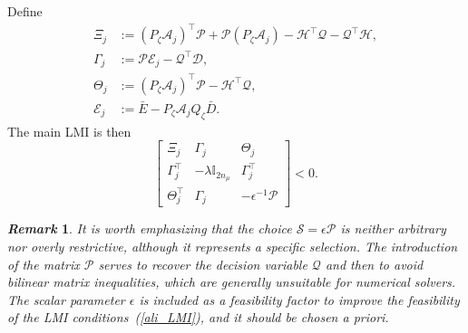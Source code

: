 \documentclass{ifacconf}
\def\eqref#1{(\ref{#1})}
\newtheorem{remark}{\it \textbf{Remark}}%
\begin{document}

Define
\begin{align*}
\Xi_j &:= \left(P_{\zeta}\mathcal{A}_{j}\right)^{\top}\mathcal{P}
      + \mathcal{P}\left(P_{\zeta}\mathcal{A}_{j}\right)
      - \mathcal{H}^{\top}\mathcal{Q} - \mathcal{Q}^{\top}\mathcal{H},\\
\Gamma_j &:= \mathcal{P}\mathcal{E}_{j} - \mathcal{Q}^{\top}\mathcal{D},\\
\Theta_j &:= \left(P_{\zeta}\mathcal{A}_{j}\right)^{\top}\mathcal{P}
      - \mathcal{H}^{\top}\mathcal{Q},\\
\mathcal{E}_{j} &:= \bar{E} - P_{\zeta}\mathcal{A}_{j}Q_{\zeta}\bar{D}.
\end{align*}
The main LMI is then
\begin{equation}\label{ali_LMI}
\left[
\begin{smallmatrix}
\Xi_j & \Gamma_j & \Theta_j\\
\Gamma_j^{\top} & -\lambda\mathbb{I}_{2n_{\mu}} & \Gamma_j^{\top}\\
\Theta_j^{\top} & \Gamma_j & -\epsilon^{-1}\mathcal{P}
\end{smallmatrix}
\right] < 0.
\end{equation}


%


\begin{remark}
It is worth emphasizing that the choice $\mathcal{S} = \epsilon \mathcal{P}$ is neither arbitrary nor overly restrictive, although it represents a specific selection. The introduction of the matrix $\mathcal{P}$ serves to recover the decision variable $\mathcal{Q}$ and then to avoid bilinear matrix inequalities, which are generally unsuitable for numerical solvers. The scalar parameter $\epsilon$ is included as a {\it feasibility factor} to improve the feasibility of the LMI conditions~\eqref{ali_LMI}, and it should be chosen a priori.
\end{remark}
\end{document}

